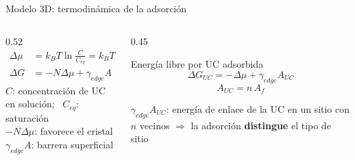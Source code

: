 \documentclass[aspectratio=169,11pt]{beamer}
\newcommand{\kB}{k_{B}}
\begin{document}
\begin{frame}{Modelo 3D: termodinámica de la adsorción}
  \begin{columns}[c,onlytextwidth]
    \begin{column}{0.52\textwidth}
      \begin{align}
        \Delta\mu &= \kB T\ln\frac{C}{C_{eq}} = \kB T\ln(\sigma+1) \tag{12}\\[0.4em]
        \Delta G  &= -N\Delta\mu + \gamma_{edge}A \tag{13}
      \end{align}
      \vspace{0.2em}
      {\footnotesize $C$: concentración de UC en solución; \ $C_{eq}$: saturación}\\[0.3em]
      {\footnotesize $-N\Delta\mu$: favorece el cristal \quad $\gamma_{edge}A$: barrera superficial}
    \end{column}
    \begin{column}{0.45\textwidth}
      \begin{block}{Energía libre por UC adsorbida}
        \begin{equation}
          \Delta G_{UC} = -\Delta\mu + \gamma_{edge}A_{UC} \tag{14}
        \end{equation}
        \[
          A_{UC} = n\,A_f
        \]
      \end{block}
      \vspace{0.4em}
      {\small $\gamma_{edge}A_{UC}$: energía de enlace de la UC en un sitio con $n$ vecinos
       $\Rightarrow$ la adsorción \textbf{distingue} el tipo de sitio}
    \end{column}
  \end{columns}
\end{frame}
\end{document}
